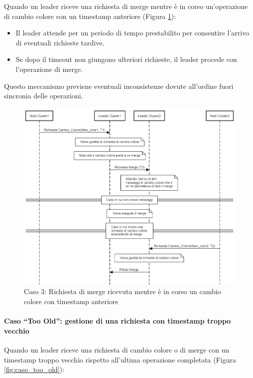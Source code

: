 \documentclass[12pt, a4paper]{report}
\begin{document}
Quando un leader riceve una richiesta di merge mentre è in corso un'operazione di cambio colore con un timestamp anteriore (Figura \ref{fig:caso3_concorrenza}):

\begin{itemize}
    \item Il leader attende per un periodo di tempo prestabilito per consentire l'arrivo di eventuali richieste tardive.
    \item Se dopo il timeout non giungono ulteriori richieste, il leader procede con l'operazione di merge.
\end{itemize}

Questo meccanismo previene eventuali inconsistenze dovute all'ordine fuori sincronia delle operazioni.

\begin{figure}[H]
    \centering
    \includegraphics[width=1\textwidth,align=t]{images/concorrenza/caso3.png}
    \caption{Caso 3: Richiesta di merge ricevuta mentre è in corso un cambio colore con timestamp anteriore}
    \label{fig:caso3_concorrenza}
\end{figure}

\newpage
\paragraph{Caso ``Too Old'': gestione di una richiesta con timestamp troppo vecchio}\label{par:too_old}

Quando un leader riceve una richiesta di cambio colore o di merge con un timestamp troppo vecchio rispetto all'ultima operazione completata (Figura \ref{fig:caso_too_old}):
\end{document}
